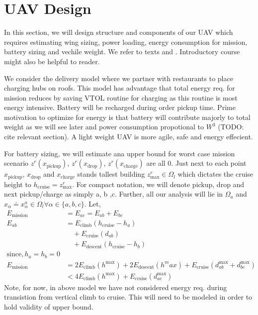 \section{UAV Design}
In this section, we will design structure and components of our UAV which requires estimating wing sizing, power loading, energy consumption for mission, battery sizing and vechile weight. We refer to texts \cite{beard2012small} and \cite{anderson1999aircraft}. Introductory course\cite{sardela2018uav} might also be helpful to reader.

We consider the delivery model where we partner with restaurants to place charging hubs on roofs. This model has advantage that total energy req. for mission reduces by saving VTOL routine for charging as this routine is most energy intensive. Battery will be recharged during order pickup time. Prime motivation to optimize for energy is that battery will contribute majorly to total weight as we will see later and power consumption propotional to $W^3$ (TODO: cite relevant section). A light weight UAV is more agile, safe and energy effecient.

For battery sizing, we will estimate ana upper bound for worst case mission scenario $z^r(x_\text{pickup})$, $z^r(x_\text{drop})$, $z^r(x_\text{charge})$ are all 0. Just next to each point $x_\text{pickup}$, $x_\text{drop}$ and $x_\text{charge}$ stands tallest building $z^r_\text{max} \in \Omega_l$ which dictates the cruise height to $h_\text{cruise} = z^r_\text{max}$. For compact notation, we will denote pickup, drop and next pickup/charge as simply a, b ,c. Further, all our analysis will lie in $ \Omega_a $ and $x_\alpha \doteq x_\alpha^a \in \Omega_l \forall \alpha \in \{a, b, c\}$.
Let,
\begin{align*}
    E_\text{mission} &= E_{ac} = E_{ab} + E_{bc}\\
    E_{ab} &= E_\text{climb}(h_\text{cruise} - h_a) \\
     & \quad + E_\text{cruise}(d_{ab}) \\
     & \quad + E_\text{descent}(h_\text{cruise} - h_b) \\
    \text{since}, h_a=h_b=0\\
    E_\text{mission} &= 2E_\text{climb}(h^\text{max}) + 2E_\text{descent}(h^max) + E_\text{cruise}(d_{ab}^\text{max} + d_{bc}^\text{max}) \\
    &< 4E_\text{climb}(h^\text{max}) + E_\text{cruise}(d_{ac}^\text{max})
\end{align*}
Note, for now, in above model we have not considered energy req. during transistion from vertical climb to cruise. This will need to be modeled in order to hold validity of upper bound. 


